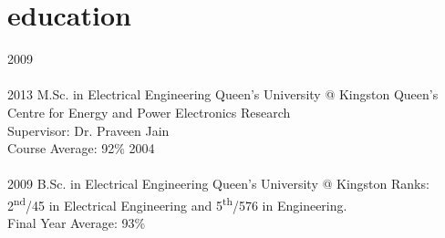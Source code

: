 
\section{education}

\begin{entrylist}
\entry
{2009\\\faChevronDown\\2013}
{M.Sc. {\normalfont in Electrical Engineering}}
{Queen's University @ Kingston}
{Queen’s Centre for Energy and Power Electronics Research\\
Supervisor: Dr. Praveen Jain\\
Course Average: 92\%}
{\vspace{-0.3cm}}
\entry
{2004\\\faChevronDown\\2009}
{B.Sc. {\normalfont in Electrical Engineering}}
{Queen's University @ Kingston}
{Ranks: 2\textsuperscript{nd}/45 in Electrical Engineering and
5\textsuperscript{th}/576 in Engineering.\\
Final Year Average: 93\%}
\end{entrylist}